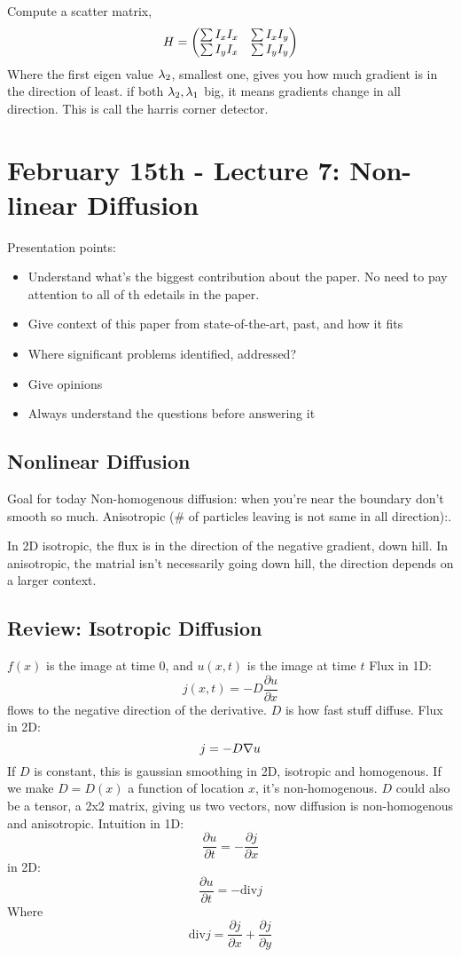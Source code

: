 Compute a scatter matrix, $$H =
\begin{pmatrix}
  \sum I_xI_x & \sum I_xI_y \\
  \sum I_yI_x & \sum I_yI_y \\
\end{pmatrix}
$$
Where the first eigen value $\lambda_2$, smallest one, gives you how much
gradient is in the direction of least.  if both $\lambda_2, \lambda_1$ big,
it means gradients change in all direction. This is call the harris
corner detector. 

\pagebreak

\section{February 15th - Lecture 7: Non-linear Diffusion}
\label{sec:febr-15th-lect}

Presentation points:
\begin{itemize}
\item Understand what's the biggest contribution about the paper. No
  need to pay attention to all of th edetails in the paper.
\item Give context of this paper from state-of-the-art, past, and how
  it fits
\item Where significant problems identified, addressed?
\item Give opinions
\item Always understand the questions before answering it
\end{itemize}

\subsection{Nonlinear Diffusion}
\label{sec:nonlinear-diffusion}
Goal for today
Non-homogenous diffusion: when you're near the boundary don't smooth
so much. Anisotropic (\# of particles leaving is not same in all direction):.

In 2D isotropic, the flux is in the direction of the negative
gradient, down hill. In anisotropic, the matrial isn't necessarily
going down hill, the direction depends on a larger context.

\subsection{Review: Isotropic Diffusion}
$f(x)$ is the image at time 0, and $u(x,t)$ is the image at time $t$
Flux in 1D: $$j(x,t) = -D \frac{\partial u}{\partial x}$$
flows to the negative direction of the derivative. $D$ is how fast
stuff diffuse.
Flux in 2D: $$j = - D \nabla u$$
If $D$ is constant, this is gaussian smoothing in 2D, isotropic and homogenous. If we make $D=D(x)$ a
function of location $x$, it's non-homogenous. $D$ could also be a tensor,
a 2x2 matrix, giving us two vectors, now diffusion is non-homogenous
and anisotropic.
Intuition in 1D: $$\frac{\partial u}{\partial t} = -\frac{\partial
  j}{\partial x}$$
in 2D: $$\frac{\partial u}{\partial t} = -\text{div} j$$
Where $$\text{div} j = \frac{\partial j}{\partial x} + \frac{\partial j}{\partial y}$$

